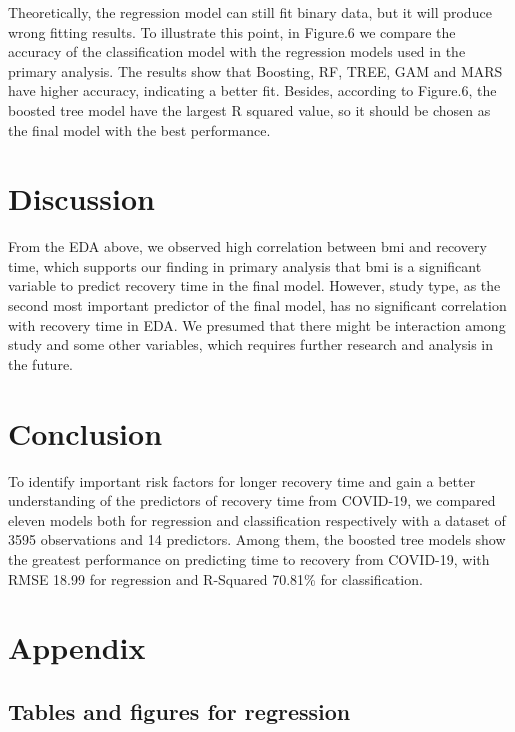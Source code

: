\documentclass[
]{article}
\begin{document}
Theoretically, the regression model can still fit binary data, but it
will produce wrong fitting results. To illustrate this point, in
Figure.6 we compare the accuracy of the classification model with the
regression models used in the primary analysis. The results show that
Boosting, RF, TREE, GAM and MARS have higher accuracy, indicating a
better fit. Besides, according to Figure.6, the boosted tree model have
the largest R squared value, so it should be chosen as the final model
with the best performance.

\hypertarget{discussion}{%
\section{Discussion}\label{discussion}}

From the EDA above, we observed high correlation between bmi and
recovery time, which supports our finding in primary analysis that bmi
is a significant variable to predict recovery time in the final model.
However, study type, as the second most important predictor of the final
model, has no significant correlation with recovery time in EDA. We
presumed that there might be interaction among study and some other
variables, which requires further research and analysis in the future.

\hypertarget{conclusion}{%
\section{Conclusion}\label{conclusion}}

To identify important risk factors for longer recovery time and gain a
better understanding of the predictors of recovery time from COVID-19,
we compared eleven models both for regression and classification
respectively with a dataset of 3595 observations and 14 predictors.
Among them, the boosted tree models show the greatest performance on
predicting time to recovery from COVID-19, with RMSE 18.99 for
regression and R-Squared 70.81\% for classification.

\newpage

\hypertarget{appendix}{%
\section{Appendix}\label{appendix}}

\hypertarget{tables-and-figures-for-regression}{%
\subsection{Tables and figures for
regression}\label{tables-and-figures-for-regression}}
\end{document}
